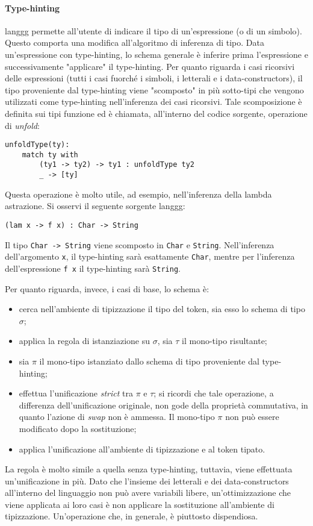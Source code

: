 \documentclass[10pt,a4paper]{article}
\begin{document}
\paragraph{Type-hinting}
langgg permette all'utente di indicare il tipo di un'espressione (o di un simbolo). Questo comporta una modifica
all'algoritmo di inferenza di tipo. Data un'espressione con type-hinting, lo schema generale è inferire prima
l'espressione e successivamente "applicare" il type-hinting. Per quanto riguarda i casi ricorsivi delle espressioni
(tutti i casi fuorché i simboli, i letterali e i data-constructors), il tipo proveniente dal type-hinting viene
"scomposto" in più sotto-tipi che vengono utilizzati come type-hinting nell'inferenza dei casi ricorsivi. Tale
scomposizione è definita sui tipi funzione ed è chiamata, all'interno del codice sorgente, operazione di
\textit{unfold}:
\begin{lstlisting}
unfoldType(ty):
    match ty with
        (ty1 -> ty2) -> ty1 : unfoldType ty2
        _ -> [ty]
\end{lstlisting}
Questa operazione è molto utile, ad esempio, nell'inferenza della lambda astrazione. Si osservi il seguente sorgente
langgg:
\begin{lstlisting}
(lam x -> f x) : Char -> String
\end{lstlisting}
Il tipo \texttt{Char -> String} viene scomposto in \texttt{Char} e \texttt{String}. Nell'inferenza dell'argomento
\texttt{x}, il type-hinting sarà esattamente \texttt{Char}, mentre per l'inferenza dell'espressione \texttt{f x}
il type-hinting sarà \texttt{String}.

Per quanto riguarda, invece, i casi di base, lo schema è:
\begin{itemize}
    \item cerca nell'ambiente di tipizzazione il tipo del token, sia esso lo schema di tipo $ \sigma $;
    \item applica la regola di istanziazione su $ \sigma $, sia $ \tau $ il mono-tipo risultante;
    \item sia $ \pi $ il mono-tipo istanziato dallo schema di tipo proveniente dal type-hinting;
    \item effettua l'unificazione \textit{strict} tra $ \pi $ e $ \tau $; si ricordi che tale operazione, a differenza
    dell'unificazione originale, non gode della proprietà commutativa, in quanto l'azione di \textit{swap} non è
    ammessa. Il mono-tipo $ \pi $ non può essere modificato dopo la sostituzione;
    \item applica l'unificazione all'ambiente di tipizzazione e al token tipato.
\end{itemize}
La regola è molto simile a quella senza type-hinting, tuttavia, viene effettuata un'unificazione in più.
Dato che l'insieme dei letterali e dei data-constructors all'interno del linguaggio non può avere variabili libere,
un'ottimizzazione che viene applicata ai loro casi è non applicare la sostituzione
all'ambiente di tipizzazione. Un'operazione che, in generale, è piuttosto dispendiosa.
\end{document}
